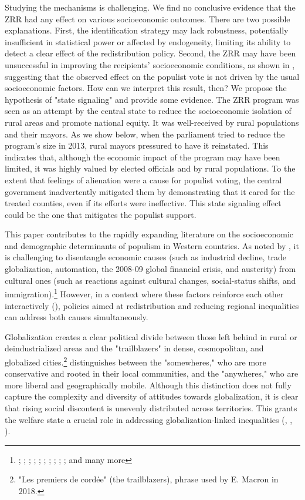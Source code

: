 Studying the mechanisms is challenging. We find no conclusive evidence that the ZRR had any effect on various socioeconomic outcomes. There are two possible explanations. First, the identification strategy may lack robustness, potentially insufficient in statistical power or affected by endogeneity, limiting its ability to detect a clear effect of the redistribution policy. Second, the ZRR may have been unsuccessful in improving the recipients' socioeconomic conditions, as shown in \cite{BEHAGHEL20151}, suggesting that the observed effect on the populist vote is not driven by the usual socioeconomic factors. How can we interpret this result, then? We propose the hypothesis of "state signaling" and provide some evidence. The ZRR program was seen as an attempt by the central state to reduce the socioeconomic isolation of rural areas and promote national equity. It was well-received by rural populations and their mayors. As we show below, when the parliament tried to reduce the program's size in 2013, rural mayors pressured to have it reinstated. This indicates that, although the economic impact of the program may have been limited, it was highly valued by elected officials and by rural populations. To the extent that feelings of alienation were a cause for populist voting, the central government inadvertently mitigated them by demonstrating that it cared for the treated counties, even if its efforts were ineffective. This state signaling effect could be the one that mitigates the populist support. 

This paper contributes to the rapidly expanding literature on the socioeconomic and demographic determinants of populism in Western countries. As noted by \cite{Inglehart2016}, it is challenging to disentangle economic causes (such as industrial decline, trade globalization, automation, the 2008-09 global financial crisis, and austerity) from cultural ones (such as reactions against cultural changes, social-status shifts, and immigration).\footnote{\cite{Inglehart2016}; \cite{Margalit2022}; \cite{Algan2017}; \cite{BACCINI_WEYMOUTH_2021}; \cite{Ferrara2023}; \cite{Colantone2018}; \cite{Autor2020}; \cite{Malgouyres}; \cite{Dippel2015} ; \cite{Fetzer2019}; and many more} However, in a context where these factors reinforce each other interactively (\cite{Gidron2017}), policies aimed at redistribution and reducing regional inequalities can address both causes simultaneously.

Globalization creates a clear political divide between those left behind in rural or deindustrialized areas and the "trailblazers" in dense, cosmopolitan, and globalized cities.\footnote{"Les premiers de cordée" (the trailblazers), phrase used by E. Macron in 2018.} \cite{Goodhart} distinguishes between the "somewheres," who are more conservative and rooted in their local communities, and the "anywheres," who are more liberal and geographically mobile. Although this distinction does not fully capture the complexity and diversity of attitudes towards globalization, it is clear that rising social discontent is unevenly distributed across territories. This grants the welfare state a crucial role in addressing globalization-linked inequalities (\cite{Samuelson}, \cite{Stiglitz}, \cite{NBERw22676}).


